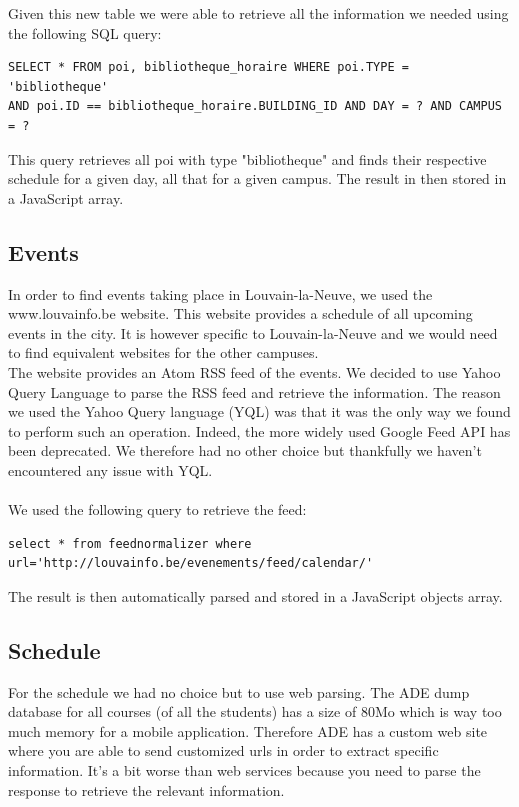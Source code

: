 \documentclass{eplmastersthesis}
\begin{document}
Given this new table we were able to retrieve all the information we needed using the following SQL query:
\begin{verbatim}
SELECT * FROM poi, bibliotheque_horaire WHERE poi.TYPE = 'bibliotheque' 
AND poi.ID == bibliotheque_horaire.BUILDING_ID AND DAY = ? AND CAMPUS = ?
\end{verbatim}

This query retrieves all poi with type "bibliotheque" and finds their respective schedule for a given day, all that for a given campus. The result in then stored in a JavaScript array.

\subsection{Events}

In order to find events taking place in Louvain-la-Neuve, we used the www.louvainfo.be website. This website provides a schedule of all upcoming events in the city. It is however specific to Louvain-la-Neuve and we would need to find equivalent websites for the other campuses. \\ The website provides an Atom RSS feed of the events. We decided to use Yahoo Query Language to parse the RSS feed and retrieve the information. The reason we used the Yahoo Query language (YQL) was that it was the only way we found to perform such an operation. Indeed, the more widely used Google Feed API has been deprecated. We therefore had no other choice but thankfully we haven't encountered any issue with YQL.\\
\\We used the following query to retrieve the feed:
\begin{verbatim}
select * from feednormalizer where url='http://louvainfo.be/evenements/feed/calendar/'
\end{verbatim}
The result is then automatically parsed and stored in a JavaScript objects array. 

\subsection{Schedule}
For the schedule we had no choice but to use web parsing. The ADE dump database for all courses (of all the students) has a size of 80Mo which is way too much memory for a mobile application. Therefore ADE has a custom web site where you are able to send customized urls in order to extract specific information. It's a bit worse than web services because you need to parse the response to retrieve the relevant information.
\end{document}
